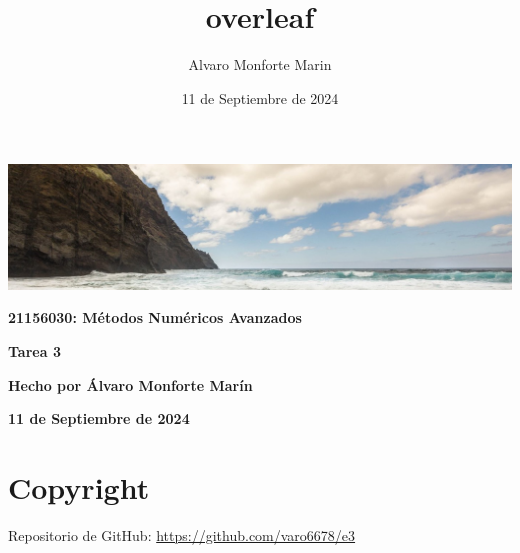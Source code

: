 \documentclass{book}[12pt, a4paper, twoside] %
\title{overleaf}
\author{Alvaro Monforte Marin}
\date{11 de Septiembre de 2024}
\begin{document}
\begin{titlepage}
    \centering
    \includegraphics[width=\textwidth, keepaspectratio]{./imagenes/1692791160594.jpg}\par\vspace{1cm}
    {\LARGE \textbf{21156030: Métodos Numéricos Avanzados} \par}\par\vspace{1cm}
    {\Huge \textbf{Tarea 3}}\par\vspace{1cm}
    \vspace{13cm}
    \begin{tcolorbox}[colback=blue!5!white,colframe=blue!75!black]
        \centering
        {\large \textbf{Hecho por Álvaro Monforte Marín} \par}
        \vfill
    \end{tcolorbox}
    {\normalsize \textbf{11 de Septiembre de 2024} \par}
\end{titlepage}

\let\cleardoublepage\clearpage %

\setcounter{page}{1}
\pagestyle{plain}

{}
\chapter*{Copyright}


Repositorio de GitHub: \url{https://github.com/varo6678/e3}

\cleardoublepage
{} %
\tableofcontents

\cleardoublepage
{}
{}
\listoffigures
\end{document}

